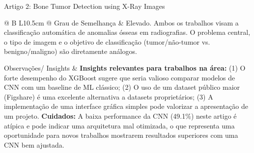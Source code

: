 \documentclass[12pt, a4paper]{article}
\begin{document}
\begin{fichabox}{Artigo 2: Bone Tumor Detection using X-Ray Images}
\begin{longtable}{@{} B L{10.5cm} @{}}
    Grau de Semelhança & Elevado. Ambos os trabalhos visam a classificação automática de anomalias ósseas em radiografias. O problema central, o tipo de imagem e o objetivo de classificação (tumor/não-tumor vs. benigno/maligno) são diretamente análogos. \\
    \addlinespace
    
    Observações/ Insights & \textbf{Insights relevantes para trabalhos na área:} (1) O forte desempenho do XGBoost sugere que seria valioso comparar modelos de CNN com um baseline de ML clássico; (2) O uso de um dataset público maior (Figshare) é uma excelente alternativa a datasets proprietários; (3) A implementação de uma interface gráfica simples pode valorizar a apresentação de um projeto. \textbf{Cuidados:} A baixa performance da CNN (49.1\%) neste artigo é atípica e pode indicar uma arquitetura mal otimizada, o que representa uma oportunidade para novos trabalhos mostrarem resultados superiores com uma CNN bem ajustada. \\
    
    \bottomrule
\end{longtable}
\end{fichabox}
\end{document}
